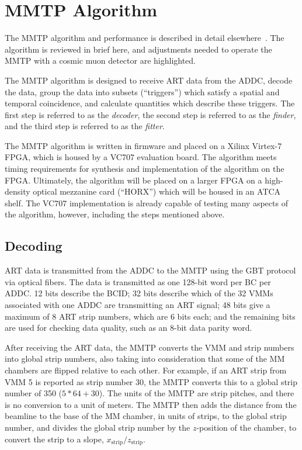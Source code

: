\section{MMTP Algorithm}
\label{sec:alg}

The MMTP algorithm and performance is described in detail elsewhere~\cite{brian,steve}. The algorithm is reviewed in brief here, and adjustments needed to operate the MMTP with a cosmic muon detector are highlighted.

The MMTP algorithm is designed to receive ART data from the ADDC, decode the data, group the data into subsets (``triggers'') which satisfy a spatial and temporal coincidence, and calculate quantities which describe these triggers. The first step is referred to as the \textit{decoder}, the second step is referred to as the \textit{finder}, and the third step is referred to as the \textit{fitter}.

The MMTP algorithm is written in firmware and placed on a Xilinx Virtex-7 FPGA, which is housed by a VC707 evaluation board. The algorithm meets timing requirements for synthesis and implementation of the algorithm on the FPGA. Ultimately, the algorithm will be placed on a larger FPGA on a high-density optical mezzanine card (``HORX'') which will be housed in an ATCA shelf. The VC707 implementation is already capable of testing many aspects of the algorithm, however, including the steps mentioned above.

\subsection{Decoding}
\label{sec:alg-decode}

ART data is transmitted from the ADDC to the MMTP using the GBT protocol via optical fibers. The data is transmitted as one 128-bit word per BC per ADDC. 12 bits describe the BCID; 32 bits describe which of the 32 VMMs associated with one ADDC are transmitting an ART signal; 48 bits give a maximum of 8 ART strip numbers, which are 6 bits each; and the remaining bits are used for checking data quality, such as an 8-bit data parity word.

After receiving the ART data, the MMTP converts the VMM and strip numbers into global strip numbers, also taking into consideration that some of the MM chambers are flipped relative to each other. For example, if an ART strip from VMM 5 is reported as strip number 30, the MMTP converts this to a global strip number of 350 ($5*64 + 30$). The units of the MMTP are strip pitches, and there is no conversion to a unit of meters. The MMTP then adds the distance from the beamline to the base of the MM chamber, in units of strips, to the global strip number, and divides the global strip number by the $z$-position of the chamber, to convert the strip to a slope, $x_\text{strip} / z_\text{strip}$.

